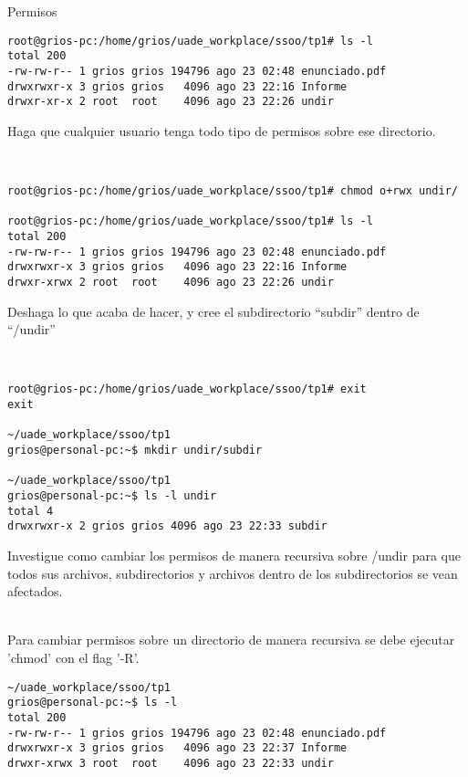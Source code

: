 \begin{section}{Permisos}
\begin{lstlisting}[style=Ubuntu]
root@grios-pc:/home/grios/uade_workplace/ssoo/tp1# ls -l
total 200
-rw-rw-r-- 1 grios grios 194796 ago 23 02:48 enunciado.pdf
drwxrwxr-x 3 grios grios   4096 ago 23 22:16 Informe
drwxr-xr-x 2 root  root    4096 ago 23 22:26 undir
\end{lstlisting}

\begin{quoting}
Haga que cualquier usuario tenga todo tipo de permisos sobre ese directorio.
\end{quoting}\\
\begin{lstlisting}[style=Ubuntu]
root@grios-pc:/home/grios/uade_workplace/ssoo/tp1# chmod o+rwx undir/

root@grios-pc:/home/grios/uade_workplace/ssoo/tp1# ls -l
total 200
-rw-rw-r-- 1 grios grios 194796 ago 23 02:48 enunciado.pdf
drwxrwxr-x 3 grios grios   4096 ago 23 22:16 Informe
drwxr-xrwx 2 root  root    4096 ago 23 22:26 undir
\end{lstlisting}

\begin{quoting}
Deshaga lo que acaba de hacer, y cree el subdirectorio “subdir” dentro de “/undir”
\end{quoting}\\
\begin{lstlisting}[style=Ubuntu]
root@grios-pc:/home/grios/uade_workplace/ssoo/tp1# exit
exit

~/uade_workplace/ssoo/tp1
grios@personal-pc:~$ mkdir undir/subdir

~/uade_workplace/ssoo/tp1
grios@personal-pc:~$ ls -l undir 
total 4
drwxrwxr-x 2 grios grios 4096 ago 23 22:33 subdir
\end{lstlisting}

\begin{quoting}
Investigue como cambiar los permisos de manera recursiva sobre /undir para que todos sus
archivos, subdirectorios y archivos dentro de los subdirectorios se vean afectados.
\end{quoting}\\

Para cambiar permisos sobre un directorio de manera recursiva se debe ejecutar 'chmod' con el flag '-R'.

\begin{lstlisting}[style=Ubuntu]
~/uade_workplace/ssoo/tp1
grios@personal-pc:~$ ls -l
total 200
-rw-rw-r-- 1 grios grios 194796 ago 23 02:48 enunciado.pdf
drwxrwxr-x 3 grios grios   4096 ago 23 22:37 Informe
drwxr-xrwx 3 root  root    4096 ago 23 22:33 undir


\end{lstlisting}
\end{section}
